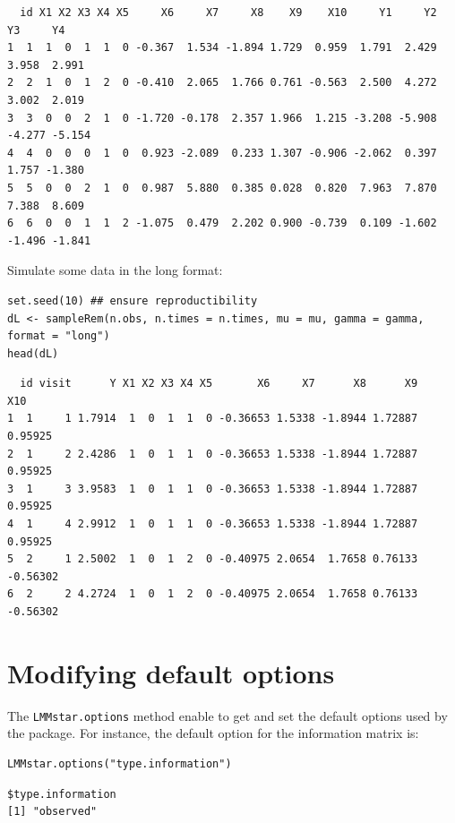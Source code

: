 \documentclass[12pt]{article}
\begin{document}
\begin{verbatim}
  id X1 X2 X3 X4 X5     X6     X7     X8    X9    X10     Y1     Y2     Y3     Y4
1  1  1  0  1  1  0 -0.367  1.534 -1.894 1.729  0.959  1.791  2.429  3.958  2.991
2  2  1  0  1  2  0 -0.410  2.065  1.766 0.761 -0.563  2.500  4.272  3.002  2.019
3  3  0  0  2  1  0 -1.720 -0.178  2.357 1.966  1.215 -3.208 -5.908 -4.277 -5.154
4  4  0  0  0  1  0  0.923 -2.089  0.233 1.307 -0.906 -2.062  0.397  1.757 -1.380
5  5  0  0  2  1  0  0.987  5.880  0.385 0.028  0.820  7.963  7.870  7.388  8.609
6  6  0  0  1  1  2 -1.075  0.479  2.202 0.900 -0.739  0.109 -1.602 -1.496 -1.841
\end{verbatim}


Simulate some data in the long format:
\lstset{language=r,label= ,caption= ,captionpos=b,numbers=none}
\begin{lstlisting}
set.seed(10) ## ensure reproductibility
dL <- sampleRem(n.obs, n.times = n.times, mu = mu, gamma = gamma, format = "long")
head(dL)
\end{lstlisting}

\begin{verbatim}
  id visit      Y X1 X2 X3 X4 X5       X6     X7      X8      X9      X10
1  1     1 1.7914  1  0  1  1  0 -0.36653 1.5338 -1.8944 1.72887  0.95925
2  1     2 2.4286  1  0  1  1  0 -0.36653 1.5338 -1.8944 1.72887  0.95925
3  1     3 3.9583  1  0  1  1  0 -0.36653 1.5338 -1.8944 1.72887  0.95925
4  1     4 2.9912  1  0  1  1  0 -0.36653 1.5338 -1.8944 1.72887  0.95925
5  2     1 2.5002  1  0  1  2  0 -0.40975 2.0654  1.7658 0.76133 -0.56302
6  2     2 4.2724  1  0  1  2  0 -0.40975 2.0654  1.7658 0.76133 -0.56302
\end{verbatim}


\clearpage

\section{Modifying default options}
\label{sec:org994da2c}
The \texttt{LMMstar.options} method enable to get and set the default options
used by the package. For instance, the default option for the information matrix is:
\lstset{language=r,label= ,caption= ,captionpos=b,numbers=none}
\begin{lstlisting}
LMMstar.options("type.information")
\end{lstlisting}

\begin{verbatim}
$type.information
[1] "observed"
\end{verbatim}
\end{document}
